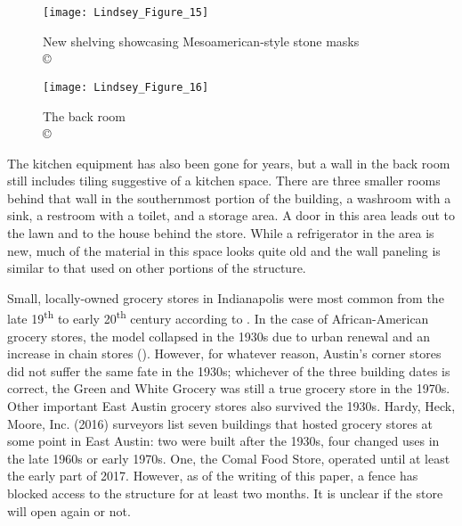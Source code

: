 \begin{figure}[!tb]
	\begin{minipage}[t]{.49\linewidth}
	\texttt{[image: Lindsey\_Figure\_15]}
	\caption{New shelving showcasing Mesoamerican-style stone masks\\
		{\normalfont\scriptsize \copyright\
			\shortauthor
	}}
	\label{fig:Lindsey_Figure_15}
\end{minipage}
\hfill
\begin{minipage}[t]{.49\linewidth}
		\texttt{[image: Lindsey\_Figure\_16]}
		\caption{The back room\\
			{\normalfont\scriptsize \copyright\
				\shortauthor
		}}
		\label{fig:Lindsey_Figure_16}
	\end{minipage}
	\end{figure}

The kitchen equipment has also been gone for years, but a wall in the back room still includes tiling suggestive of a kitchen space. There are three smaller rooms behind that wall in the southernmost portion of the building, a washroom with a sink, a restroom with a toilet, and a storage area. A door in this area leads out to the lawn and to the house behind the store. While a refrigerator in the area is new, much of the material in this space looks quite old and the wall paneling is similar to that used on other portions of the structure.



Small, locally-owned grocery stores in Indianapolis were most common from the late 19\textsuperscript{th} to early 20\textsuperscript{th} century according to \textcite{mullins}. In the case of African-American grocery stores, the model collapsed in the 1930s due to urban renewal and an increase in chain stores (\cite[88]{mullins}). However, for whatever reason, Austin’s corner stores did not suffer the same fate in the 1930s; whichever of the three building dates is correct, the Green and White Grocery was still a true grocery store in the 1970s. Other important East Austin grocery stores also survived the 1930s. Hardy, Heck, Moore, Inc. (2016) surveyors list seven buildings that hosted grocery stores at some point in East Austin: two were built after the 1930s, four changed uses in the late 1960s or early 1970s. One, the Comal Food Store, operated until at least the early part of 2017. However, as of the writing of this paper, a fence has blocked access to the structure for at least two months. It is unclear if the store will open again or not.

